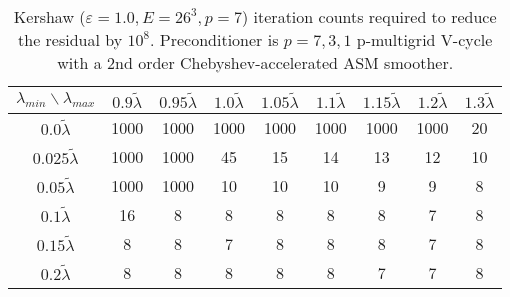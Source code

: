 \begin{table}
\centering
\begin{tabular}{||c| c c c c c c c c||}
  \hline
  $\lambda_{min}\backslash \lambda_{max}$ & $0.9 \tilde\lambda$ & $0.95 \tilde\lambda$ & $1.0 \tilde\lambda$ & $1.05 \tilde\lambda$ & $1.1 \tilde\lambda$ & $1.15 \tilde\lambda$ & $1.2 \tilde\lambda$ & $1.3 \tilde\lambda$  \\ 
\hline\hline
$0.0 \tilde\lambda$ & 1000 & 1000 & 1000 & 1000 & 1000 & 1000 & 1000 & 20 \\ 
$0.025 \tilde\lambda$ & 1000 & 1000 & 45 & 15 & 14 & 13 & 12 & 10 \\ 
$0.05 \tilde\lambda$ & 1000 & 1000 & 10 & 10 & 10 & 9 & 9 & 8 \\ 
$0.1 \tilde\lambda$ & 16 & 8 & 8 & 8 & 8 & 8 & 7 & 8 \\ 
$0.15 \tilde\lambda$ & 8 & 8 & 7 & 8 & 8 & 8 & 7 & 8 \\ 
$0.2 \tilde\lambda$ & 8 & 8 & 8 & 8 & 8 & 7 & 7 & 8 \\ 
\hline
\end{tabular}
\caption{
  Kershaw ($\varepsilon=1.0, E=26^3, p=7$) iteration counts required to reduce the residual by $10^8$.
  Preconditioner is $p=7,3,1$ p-multigrid V-cycle with a 2nd order Chebyshev-accelerated ASM smoother.
  \label{table:kershaw-eig-multiplier-1.0}}
\end{table}

